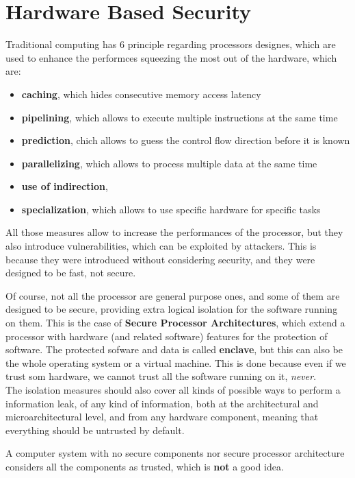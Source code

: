 \chapter{Hardware Based Security}
Traditional computing has 6 principle regarding processors designes, which are used to enhance the
performces squeezing the most out of the hardware, which are:
\begin{itemize}
  \item \textbf{caching}, which hides consecutive memory access latency
  \item \textbf{pipelining}, which allows to execute multiple instructions at the same time
  \item \textbf{prediction}, chich allows to guess the control flow direction before it is known
  \item \textbf{parallelizing}, which allows to process multiple data at the same time
  \item \textbf{use of indirection},
  \item \textbf{specialization}, which allows to use specific hardware for specific tasks
\end{itemize}
All those measures allow to increase the performances of the processor, but they also introduce
vulnerabilities, which can be exploited by attackers.  This is because they were introduced without
considering security, and they were designed to be fast, not secure.  

Of course, not all the processor are general purpose ones, and some of them are designed to be
secure, providing extra logical isolation for the software running on them. This is the case of 
\textbf{Secure Processor Architectures}, which extend a processor with hardware (and related
software) features for the protection of software. The protected sofware and data is called
\textbf{enclave}, but this can also be the whole operating system or a virtual machine. This is done
because even if we trust som hardware, we cannot trust all the software running on it,
\textit{never}.\\
The isolation measures should also cover all kinds of possible ways to perform a information leak,
of any kind of information, both at the architectural and microarchitectural level, and from any
hardware component, meaning that everything should be untrusted by default.
\begin{boxH}
  A computer system with no secure components nor secure processor architecture considers all the
  components as trusted, which is \textbf{not} a good idea.
\end{boxH}

